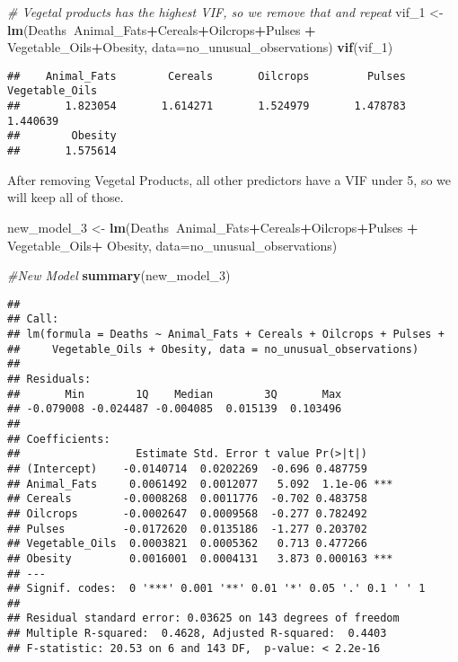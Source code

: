 \documentclass[
]{article}
\newenvironment{Shaded}{\begin{snugshade}}{\end{snugshade}}
\newcommand{\CommentTok}[1]{\textcolor[rgb]{0.56,0.35,0.01}{\textit{#1}}}
\newcommand{\DataTypeTok}[1]{\textcolor[rgb]{0.13,0.29,0.53}{#1}}
\newcommand{\DecValTok}[1]{\textcolor[rgb]{0.00,0.00,0.81}{#1}}
\newcommand{\KeywordTok}[1]{\textcolor[rgb]{0.13,0.29,0.53}{\textbf{#1}}}
\newcommand{\NormalTok}[1]{#1}
\newcommand{\OperatorTok}[1]{\textcolor[rgb]{0.81,0.36,0.00}{\textbf{#1}}}
\newcommand{\StringTok}[1]{\textcolor[rgb]{0.31,0.60,0.02}{#1}}
\begin{document}
\begin{Shaded}
\begin{Highlighting}[]
\CommentTok{# Vegetal products has the highest VIF, so we remove that and repeat}
\NormalTok{vif_}\DecValTok{1}\NormalTok{ <-}\StringTok{ }\KeywordTok{lm}\NormalTok{(Deaths}\OperatorTok{~}\NormalTok{Animal_Fats}\OperatorTok{+}\NormalTok{Cereals}\OperatorTok{+}\NormalTok{Oilcrops}\OperatorTok{+}\NormalTok{Pulses }\OperatorTok{+}\StringTok{ }\NormalTok{Vegetable_Oils}\OperatorTok{+}\NormalTok{Obesity, }
            \DataTypeTok{data=}\NormalTok{no_unusual_observations)}
\KeywordTok{vif}\NormalTok{(vif_}\DecValTok{1}\NormalTok{)}
\end{Highlighting}
\end{Shaded}

\begin{verbatim}
##    Animal_Fats        Cereals       Oilcrops         Pulses Vegetable_Oils 
##       1.823054       1.614271       1.524979       1.478783       1.440639 
##        Obesity 
##       1.575614
\end{verbatim}

After removing Vegetal Products, all other predictors have a VIF under
5, so we will keep all of those.

\begin{Shaded}
\begin{Highlighting}[]
\NormalTok{new_model_}\DecValTok{3}\NormalTok{ <-}\StringTok{ }\KeywordTok{lm}\NormalTok{(Deaths}\OperatorTok{~}\NormalTok{Animal_Fats}\OperatorTok{+}\NormalTok{Cereals}\OperatorTok{+}\NormalTok{Oilcrops}\OperatorTok{+}\NormalTok{Pulses }\OperatorTok{+}\StringTok{ }\NormalTok{Vegetable_Oils}\OperatorTok{+}
\StringTok{                    }\NormalTok{Obesity, }\DataTypeTok{data=}\NormalTok{no_unusual_observations)}

\CommentTok{#New Model }
\KeywordTok{summary}\NormalTok{(new_model_}\DecValTok{3}\NormalTok{)}
\end{Highlighting}
\end{Shaded}

\begin{verbatim}
## 
## Call:
## lm(formula = Deaths ~ Animal_Fats + Cereals + Oilcrops + Pulses + 
##     Vegetable_Oils + Obesity, data = no_unusual_observations)
## 
## Residuals:
##       Min        1Q    Median        3Q       Max 
## -0.079008 -0.024487 -0.004085  0.015139  0.103496 
## 
## Coefficients:
##                  Estimate Std. Error t value Pr(>|t|)    
## (Intercept)    -0.0140714  0.0202269  -0.696 0.487759    
## Animal_Fats     0.0061492  0.0012077   5.092  1.1e-06 ***
## Cereals        -0.0008268  0.0011776  -0.702 0.483758    
## Oilcrops       -0.0002647  0.0009568  -0.277 0.782492    
## Pulses         -0.0172620  0.0135186  -1.277 0.203702    
## Vegetable_Oils  0.0003821  0.0005362   0.713 0.477266    
## Obesity         0.0016001  0.0004131   3.873 0.000163 ***
## ---
## Signif. codes:  0 '***' 0.001 '**' 0.01 '*' 0.05 '.' 0.1 ' ' 1
## 
## Residual standard error: 0.03625 on 143 degrees of freedom
## Multiple R-squared:  0.4628, Adjusted R-squared:  0.4403 
## F-statistic: 20.53 on 6 and 143 DF,  p-value: < 2.2e-16
\end{verbatim}
\end{document}

